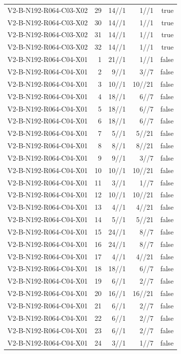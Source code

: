 {\begin{longtable}{lrrrr}
V2-B-N192-R064-C03-X02 & 29 & 14//1 & 1//1 & true \\
V2-B-N192-R064-C03-X02 & 30 & 14//1 & 1//1 & true \\
V2-B-N192-R064-C03-X02 & 31 & 14//1 & 1//1 & true \\
V2-B-N192-R064-C03-X02 & 32 & 14//1 & 1//1 & true \\
V2-B-N192-R064-C04-X01 & 1 & 21//1 & 1//1 & false \\
V2-B-N192-R064-C04-X01 & 2 & 9//1 & 3//7 & false \\
V2-B-N192-R064-C04-X01 & 3 & 10//1 & 10//21 & false \\
V2-B-N192-R064-C04-X01 & 4 & 18//1 & 6//7 & false \\
V2-B-N192-R064-C04-X01 & 5 & 18//1 & 6//7 & false \\
V2-B-N192-R064-C04-X01 & 6 & 18//1 & 6//7 & false \\
V2-B-N192-R064-C04-X01 & 7 & 5//1 & 5//21 & false \\
V2-B-N192-R064-C04-X01 & 8 & 8//1 & 8//21 & false \\
V2-B-N192-R064-C04-X01 & 9 & 9//1 & 3//7 & false \\
V2-B-N192-R064-C04-X01 & 10 & 10//1 & 10//21 & false \\
V2-B-N192-R064-C04-X01 & 11 & 3//1 & 1//7 & false \\
V2-B-N192-R064-C04-X01 & 12 & 10//1 & 10//21 & false \\
V2-B-N192-R064-C04-X01 & 13 & 4//1 & 4//21 & false \\
V2-B-N192-R064-C04-X01 & 14 & 5//1 & 5//21 & false \\
V2-B-N192-R064-C04-X01 & 15 & 24//1 & 8//7 & false \\
V2-B-N192-R064-C04-X01 & 16 & 24//1 & 8//7 & false \\
V2-B-N192-R064-C04-X01 & 17 & 4//1 & 4//21 & false \\
V2-B-N192-R064-C04-X01 & 18 & 18//1 & 6//7 & false \\
V2-B-N192-R064-C04-X01 & 19 & 6//1 & 2//7 & false \\
V2-B-N192-R064-C04-X01 & 20 & 16//1 & 16//21 & false \\
V2-B-N192-R064-C04-X01 & 21 & 6//1 & 2//7 & false \\
V2-B-N192-R064-C04-X01 & 22 & 6//1 & 2//7 & false \\
V2-B-N192-R064-C04-X01 & 23 & 6//1 & 2//7 & false \\
V2-B-N192-R064-C04-X01 & 24 & 3//1 & 1//7 & false \\

\end{longtable}}
